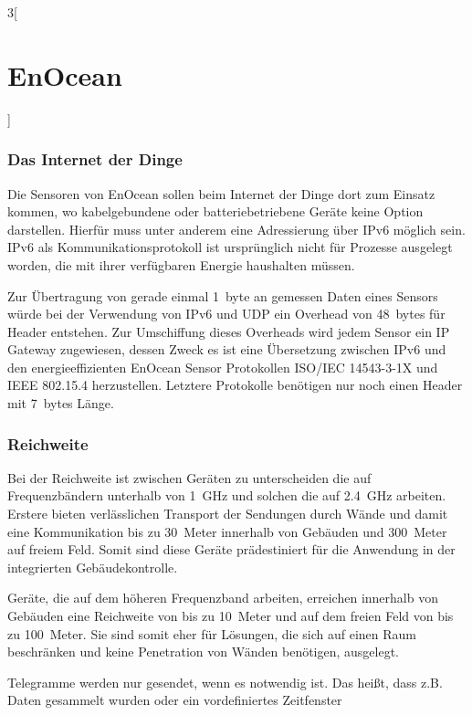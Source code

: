 \begin{multicols}{3}[\section{EnOcean}]
\subsubsection*{Das Internet der Dinge}
Die Sensoren von EnOcean sollen beim Internet der Dinge dort zum Einsatz kommen, wo kabelgebundene oder batteriebetriebene Geräte keine Option darstellen. Hierfür muss unter anderem eine Adressierung über IPv6 möglich sein. IPv6 als Kommunikationsprotokoll ist ursprünglich nicht für Prozesse ausgelegt worden, die mit ihrer verfügbaren Energie haushalten müssen.  

Zur Übertragung von gerade einmal \SI{1}{byte} an gemessen Daten eines Sensors würde bei der Verwendung von IPv6 und UDP ein Overhead von \SI{48}{bytes} für Header entstehen. Zur Umschiffung dieses Overheads wird jedem Sensor ein IP Gateway zugewiesen, dessen Zweck es ist eine Übersetzung zwischen IPv6 und den energieeffizienten EnOcean Sensor Protokollen ISO/IEC 14543-3-1X und IEEE 802.15.4 herzustellen. Letztere Protokolle benötigen nur noch einen Header mit \SI{7}{bytes} Länge.~\cite{enocean.8}

\subsubsection*{Reichweite}
Bei der Reichweite ist zwischen Geräten zu unterscheiden die auf Frequenzbändern unterhalb von \SI{1}{GHz} und solchen die auf \SI{2,4}{GHz} arbeiten. Erstere bieten verlässlichen Transport der Sendungen durch Wände und damit eine Kommunikation bis zu \SI{30}{Meter} innerhalb von Gebäuden und \SI{300}{Meter} auf freiem Feld. Somit sind diese Geräte prädestiniert für die Anwendung in der integrierten Gebäudekontrolle. 

Geräte, die auf dem höheren Frequenzband arbeiten, erreichen innerhalb von Gebäuden eine Reichweite von bis zu \SI{10}{Meter} und auf dem freien Feld von bis zu \SI{100}{Meter}. Sie sind somit eher für Lösungen, die sich auf einen Raum beschränken und keine Penetration von Wänden benötigen, ausgelegt.

Telegramme werden nur gesendet, wenn es notwendig ist. Das heißt, dass z.B. Daten gesammelt wurden oder ein vordefiniertes Zeitfenster %

\end{multicols}
\newpage
